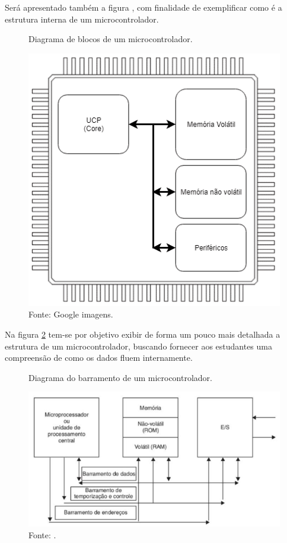 \documentclass[12pt,a4paper]{report}
\begin{document}
Será apresentado também a figura , com finalidade de exemplificar como é a estrutura interna de um microcontrolador.

\begin{figure}[H]      %
\begin{center}		   %
\caption{Diagrama de blocos de um microcontrolador.}		%
\includegraphics[scale=0.5]{fig/basic_microcontroller.png}
\caption*{Fonte: Google imagens.}
\label{fig:basic_microcontroller}
\end{center}
\end{figure}

Na figura \ref{fig:architecture_microcontroller} tem-se por objetivo exibir de forma um pouco mais detalhada a estrutura de um microcontrolador, buscando fornecer aos estudantes uma compreensão de como os dados fluem internamente.

\begin{figure}[H]      %
    \begin{center}		   %
    \caption{Diagrama do barramento de um microcontrolador.}		%
    \includegraphics[scale=0.5]{fig/architecture_microcontroller.png}
    \caption*{Fonte: \cite{ci:microcontroller_8051}.}
    \label{fig:architecture_microcontroller}
    \end{center}
\end{figure}
\end{document}
